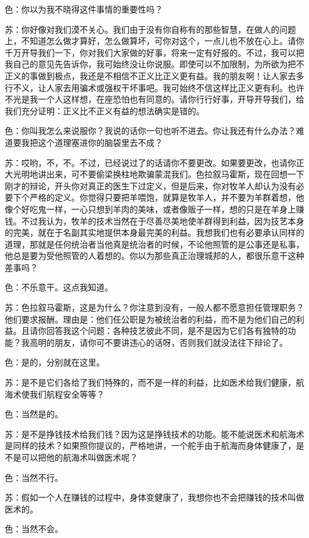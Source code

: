 \documentclass[12pt,oneside]{book}
\begin{document}
色：你以为我不晓得这件事情的重要性吗？

苏：你好像对我们漠不关心。我们由于没有你自称有的那些智慧，在做人的问题上，不知道怎么做才算好，怎么做算坏，可你对这个，一点儿也不放在心上。请你千万开导我们一下，你对我们大家做的好事，将来一定有好报的。不过，我可以把我自己的意见先告诉你，我可始终没让你说服。即使可以不加限制，为所欲为把不正义的事做到极点，我还是不相信不正义比正义更有益。我的朋友啊！让人家去多行不义，让人家去用骗术或强权干坏事吧。我可始终不信这样比正义更有利。也许不光是我一个人这样想，在座恐怕也有同意的。请你行行好事，开导开导我们，给我们充分证明：正义比不正义有益的想法确实是错的。

色：你叫我怎么来说服你？我说的话你一句也听不进去。你让我还有什么办法？难道要我把这个道理塞进你的脑袋里去不成？

苏：哎哟，不，不。不过，已经说过了的话请你不要更改。如果要更改，也请你正大光明地讲出来，可不要偷梁换柱地欺骗蒙混我们。色拉叙马霍斯，现在回想一下刚才的辩论，开头你对真正的医生下过定义，但是后来，你对牧羊人却认为没有必要下个严格的定义。你觉得只要把羊喂饱，就算是牧羊人，并不要为羊群着想，他像个好吃鬼一样，一心只想到羊肉的美味，或者像贩子一样，想的只是在羊身上赚钱。不过我认为，牧羊的技术当然在于尽善尽美地使羊群得到利益，因为技艺本身的完美，就在于名副其实地提供本身最完美的利益。我想我们也有必要承认同样的道理，那就是任何统治者当他真是统治者的时候，不论他照管的是公事还是私事，他总是要为受他照管的人着想的。你以为那些真正治理城邦的人，都很乐意干这种差事吗？

色：不乐意干。这点我知道。

苏：色拉叙马霍斯，这是为什么？你注意到没有，一般人都不愿意担任管理职务？他们要求报酬。理由是：他们任公职是为被统治者的利益，而不是为他们自己的利益。且请你回答我这个问题：各种技艺彼此不同，是不是因为它们各有独特的功能？我高明的朋友，请你可不要讲违心的话呀，否则我们就没法往下辩论了。

色：是的，分别就在这里。

苏：是不是它们各给了我们特殊的，而不是一样的利益，比如医术给我们健康，航海术使我们航程安全等等？

色：当然是的。

苏：是不是挣钱技术给我们钱？因为这是挣钱技术的功能。能不能说医术和航海术是同样的技术？如果照你提议的，严格地讲，一个舵手由于航海而身体健康了，是不是可以把他的航海术叫做医术呢？

色：当然不行。

苏：假如一个人在赚钱的过程中，身体变健康了，我想你也不会把赚钱的技术叫做医术的。

色：当然不会。
\end{document}
